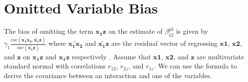 \documentclass[12pt]{article}
\begin{document}
%
%
%
%
%
%
%
%
%
%
\section{Omitted Variable Bias} \label{appendix-omitted}

The bias of omitting the term $\mathbf{x_1 z}$ on the estimate of $\beta^{p3}_{12}$ is given by $\gamma_1 \frac{cov(\widetilde{\mathbf{x_1 x_2}}, \widetilde{\mathbf{x_1 z}})} {var(\widetilde{\mathbf{x_1 z}})}$ where $\widetilde{\mathbf{x_1 x_2}}$ and $\widetilde{\mathbf{x_1 z}}$ are the residual vector of regressing $\mathbf{x1}$, $\mathbf{x2}$, and $\mathbf{z}$ on $\mathbf{x_1 z}$ and $\mathbf{x_1 z}$ respectively \citep{angrist2008mostly,cunningham_causal_2018}. 
Assume that $\mathbf{x1}$, $\mathbf{x2}$, and $\mathbf{z}$ are multivariate standard normal with correlations $r_{12}$, $r_{2z}$, and $r_{1z}$. We can use the \citet{isserlis_formula_1918} formula to derive the covariance between an interaction and one of the variables. 
\end{document}
